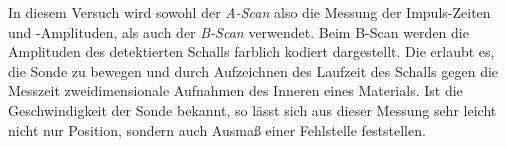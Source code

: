 In diesem Versuch wird sowohl der \textit{A-Scan} also die Messung der
Impuls-Zeiten und -Amplituden, als auch der \textit{B-Scan} verwendet.
Beim B-Scan werden die Amplituden des detektierten Schalls farblich kodiert
dargestellt. Die erlaubt es, die Sonde zu bewegen und durch Aufzeichnen des
Laufzeit des Schalls gegen die Messzeit zweidimensionale Aufnahmen des Inneren
eines Materials. Ist die Geschwindigkeit der Sonde bekannt, so lässt sich aus
dieser Messung sehr leicht nicht nur Position, sondern auch Ausmaß einer
Fehlstelle feststellen.
